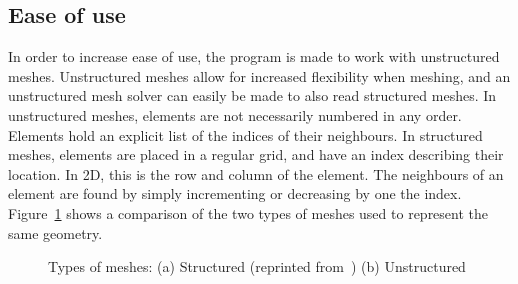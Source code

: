 \subsection{Ease of use}\label{subsection:graphics_processing_units:data_structure:ease_of_use}

In order to increase ease of use, the program is made to work with unstructured meshes. Unstructured
meshes allow for increased flexibility when meshing, and an unstructured mesh solver can easily be
made to also read structured meshes. In unstructured meshes, elements are not necessarily numbered
in any order. Elements hold an explicit list of the indices of their neighbours. In structured
meshes, elements are placed in a regular grid, and have an index describing their location. In 2D,
this is the row and column of the element. The neighbours of an element are found by simply
incrementing or decreasing by one the index. Figure~\ref{fig:mesh_types} shows a comparison of the
two types of meshes used to represent the same geometry. 

\begin{figure}[H]
    \centering
    \qquad
    \caption{Types of meshes: (a) Structured (reprinted from~\cite{Rahman2015}) (b) Unstructured}\label{fig:mesh_types}
\end{figure}

